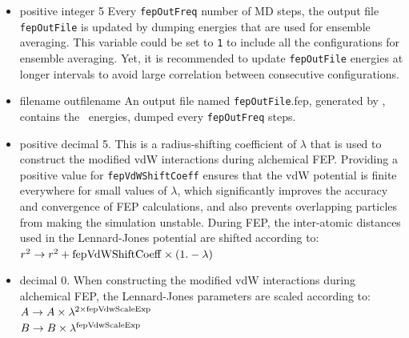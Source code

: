 \begin{itemize}
\item
{}
{positive integer}
{5}
{Every {\tt fepOutFreq} number of MD steps, the output file
{\tt fepOutFile} is updated by dumping energies that are
used for ensemble averaging.
This variable could be set to {\tt 1} to include all the 
configurations for ensemble averaging. Yet, it is recommended
to update {\tt fepOutFile}  energies at longer intervals
to avoid large correlation between consecutive configurations.}

\item
{}
{filename}
{outfilename}
{An output file named {\tt fepOutFile}.fep, generated by \NAMD,
contains the \FEP\ energies, dumped every {\tt fepOutFreq} steps.}

\item
{}
{positive decimal}
{5.}
{This is a radius-shifting coefficient of $\lambda$ that is used 
to construct the modified vdW interactions during alchemical FEP. Providing a positive value for {\tt fepVdWShiftCoeff} ensures that the vdW potential is finite everywhere for small values of $\lambda$, which significantly improves the accuracy and convergence of FEP calculations, and also prevents overlapping particles from making the simulation unstable. During FEP, the inter-atomic distances used in the Lennard-Jones potential are shifted
according to: \\
$r^2 \rightarrow r^2 + {\rm fepVdWShiftCoeff} \times (1. - \lambda)$
}

\item
{}
{decimal}
{0.}
{When constructing the modified vdW interactions during alchemical FEP, the Lennard-Jones parameters are scaled according to:\\
$A \rightarrow A \times \lambda^{2 \times {\rm fepVdwScaleExp}}$ \\
$B \rightarrow B \times \lambda^{\rm fepVdwScaleExp}$
}



\end{itemize}


